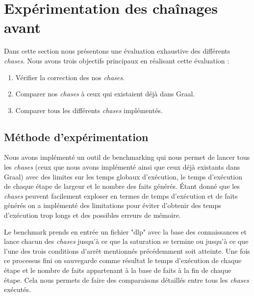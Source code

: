 \section{Expérimentation des chaînages avant}\label{sec:experimentation}

Dans cette section nous présentons une évaluation exhaustive des différents \textit{chases}. Nous avons trois objectifs principaux en réalisant cette évaluation :

\begin{enumerate}
  \item Vérifier la correction des nos \textit{chases}.
  \item Comparer nos \textit{chases} à ceux qui existaient déjà dans Graal.
  \item Comparer tous les différents \textit{chases} implémentés. 
\end{enumerate}

\subsection{Méthode d'expérimentation}

Nous avons implémenté un outil de benchmarking qui nous permet de lancer tous les \textit{chases} (ceux que nous avons implémenté ainsi que ceux déjà existants dans Graal) avec des limites sur les temps globaux d'exécution, le temps d'exécution de chaque étape de largeur et le nombre des faits générés. Étant donné que les \textit{chases} peuvent facilement exploser en termes de temps d'exécution et de faits générés on a implémenté des limitations pour éviter d'obtenir des temps d'exécution trop longs et des possibles erreurs de mémoire. 

Le benchmark prends en entrée un fichier "dlp" avec la base des connaissances et lance chacun des \textit{chases} jusqu'à ce que la saturation se termine ou jusqu'à ce que l'une des trois conditions d'arrêt mentionnés précédemment soit atteinte. Une fois ce processus fini on sauvegarde comme résultat le temps d'exécution de chaque étape et le nombre de faits appartenant à la base de faits à la fin de chaque étape. Cela nous permets de faire des comparaisons détaillés entre tous les \textit{chases} exécutés.


